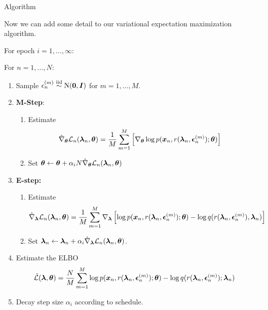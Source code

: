 \documentclass[aspectratio=169]{beamer}
\begin{document}
\begin{frame}[t,allowframebreaks]{Algorithm}\label{algorithm}

Now we can add some detail to our variational expectation maximization
algorithm.

For epoch \(i=1,\ldots,\infty\):

For \(n=1,\ldots,N\):

\begin{enumerate}
\def\labelenumi{\arabic{enumi}.}
\item
  Sample \(\epsilon_n^{(m)} \stackrel{\text{iid}}{\sim} \mathrm{N}(\boldsymbol{0}, \boldsymbol{I})\) for
  \(m=1,\ldots,M\).
\item
  \textbf{M-Step}:

  \begin{enumerate}
  \def\labelenumii{\alph{enumii}.}
  \item
    Estimate \begin{align*}
     \hat{\nabla}_{\boldsymbol{\theta}} \mathcal{L}_n(\boldsymbol{\lambda}_n, \boldsymbol{\theta})
     &= 
     \frac{1}{M} \sum_{m=1}^M \left[ \nabla_{\boldsymbol{\theta}} \log p(\boldsymbol{x}_n, r(\boldsymbol{\lambda}_n, \boldsymbol{\epsilon}_n^{(m)}); \boldsymbol{\theta}) \right]
     \end{align*}
  \item
    Set
    \(\boldsymbol{\theta} \leftarrow \boldsymbol{\theta} + \alpha_i N \hat{\nabla}_{\boldsymbol{\theta}} \mathcal{L}_n(\boldsymbol{\lambda}_n, \boldsymbol{\theta})\)
  \end{enumerate}
\item
  \textbf{E-step:}

  \begin{enumerate}
  \def\labelenumii{\alph{enumii}.}
  \item
    Estimate \begin{align*}
     \hat{\nabla}_{\boldsymbol{\lambda}} \mathcal{L}_n(\boldsymbol{\lambda}_n, \boldsymbol{\theta}) 
     &= \frac{1}{M} \sum_{m=1}^M \nabla_{\boldsymbol{\lambda}} \left[\log p(\boldsymbol{x}_n, r(\boldsymbol{\lambda}_n, \boldsymbol{\epsilon}_n^{(m)}); \boldsymbol{\theta}) - \log q(r(\boldsymbol{\lambda}_n, \boldsymbol{\epsilon}_n^{(m)}), \boldsymbol{\lambda}_n) \right]
     \end{align*}
  \item
    Set
    \(\boldsymbol{\lambda}_n \leftarrow \boldsymbol{\lambda}_n + \alpha_i \hat{\nabla}_{\boldsymbol{\lambda}} \mathcal{L}_n(\boldsymbol{\lambda}_n, \boldsymbol{\theta})\).
  \end{enumerate}
\item
  Estimate the ELBO \begin{align*}
   \hat{\mathcal{L}}(\boldsymbol{\lambda}, \boldsymbol{\theta}) 
   &= \frac{N}{M} \sum_{m=1}^M \log p(\boldsymbol{x}_n, r(\boldsymbol{\lambda}_n, \boldsymbol{\epsilon}_n^{(m)}); \boldsymbol{\theta}) - \log q(r(\boldsymbol{\lambda}_n, \boldsymbol{\epsilon}_n^{(m)}); \boldsymbol{\lambda}_n)
   \end{align*}
\item
  Decay step size \(\alpha_i\) according to schedule. 
\end{enumerate}
\end{frame}
\end{document}
